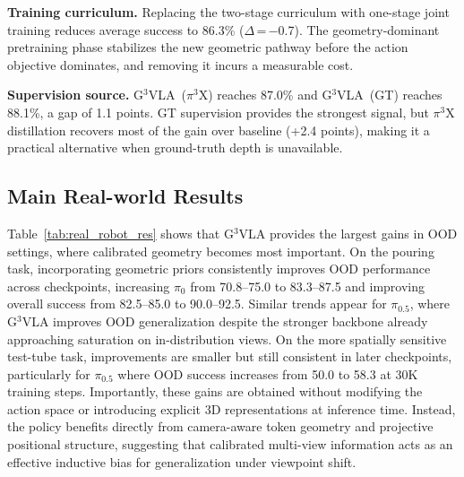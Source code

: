 \documentclass{article}
\begin{document}
\textbf{Training curriculum.} Replacing the two-stage curriculum with one-stage
joint training reduces average success to 86.3\% ($\Delta$\,=\,$-$0.7). The
geometry-dominant pretraining phase stabilizes the new geometric pathway before
the action objective dominates, and removing it incurs a measurable cost.

\textbf{Supervision source.} G$^3$VLA~($\pi^3$X) reaches 87.0\% and
G$^3$VLA~(GT) reaches 88.1\%, a gap of 1.1 points. GT supervision
provides the strongest signal, but $\pi^3$X distillation recovers most
of the gain over baseline (+2.4 points), making it a practical alternative when
ground-truth depth is unavailable.

\subsection{Main Real-world Results}
Table~\ref{tab:real_robot_res} shows that G$^3$VLA provides the largest gains in OOD settings, where calibrated geometry becomes most important. On the pouring task, incorporating geometric priors consistently improves OOD performance across checkpoints, increasing $\pi_0$ from 70.8--75.0 to 83.3--87.5 and improving overall success from 82.5--85.0 to 90.0--92.5. Similar trends appear for $\pi_{0.5}$, where G$^3$VLA improves OOD generalization despite the stronger backbone already approaching saturation on in-distribution views. On the more spatially sensitive test-tube task, improvements are smaller but still consistent in later checkpoints, particularly for $\pi_{0.5}$ where OOD success increases from 50.0 to 58.3 at 30K training steps. Importantly, these gains are obtained without modifying the action space or introducing explicit 3D representations at inference time. Instead, the policy benefits directly from camera-aware token geometry and projective positional structure, suggesting that calibrated multi-view information acts as an effective inductive bias for generalization under viewpoint shift.
\end{document}
